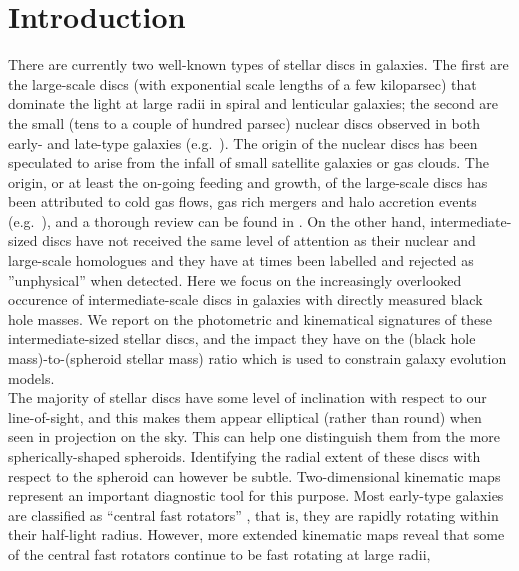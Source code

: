 \documentclass[useAMS,usenatbib,article]{mnras}
\begin{document}
\section{Introduction}
\label{sec:int}
There are currently two well-known types of stellar discs in galaxies. 
The first are the large-scale discs (with exponential scale lengths of a few kiloparsec) 
that dominate the light at large radii in spiral and lenticular galaxies; 
the second are the small (tens to a couple of hundred parsec) nuclear discs observed in both early- and late-type galaxies 
(e.g.~\citealt{scorzavandenbosch1998,rest2001,balcells2007,ledo2010}). 
The origin of the nuclear discs has been speculated to arise from the infall of small satellite galaxies or gas clouds.  
The origin, or at least the on-going feeding and growth, of the large-scale discs has been attributed to cold gas flows, 
gas rich mergers and halo accretion events 
(e.g.~\citealt{whiterees1978,whitefrenk1991,navarrobenz1991,barneshernquist1992,khochfarsilk2006,dekel2009nat,ceverino2010,
ceverino2012,conselice2012,rubin2012,martini2013,ueda2014}), 
and a thorough review can be found in \citet{combes2014arX,combes2014pro}.
On the other hand, intermediate-sized discs have not received the same level of attention 
as their nuclear and large-scale homologues and 
they have at times been labelled and rejected as ''unphysical'' when detected. 
Here we focus on the increasingly overlooked occurence of intermediate-scale discs in galaxies with directly measured black hole masses. 
We report on the photometric and kinematical signatures of these intermediate-sized stellar discs,  
and the impact they have on the (black hole mass)-to-(spheroid stellar mass) ratio 
which is used to constrain galaxy evolution models. \\
The majority of stellar discs have some level of inclination with respect to our line-of-sight, 
and this makes them appear elliptical (rather than round) when seen in projection on the sky. 
This can help one distinguish them from the more spherically-shaped spheroids. 
Identifying the radial extent of these discs with respect to the spheroid can however be subtle. 
Two-dimensional kinematic maps represent an important diagnostic tool for this purpose. 
Most early-type galaxies are classified as ``central fast rotators'' \citep{franx1989,atlas3dIII,scott2014}, 
that is, they are rapidly rotating within their half-light radius.  
However, more extended kinematic maps \citep{arnold2014} reveal that 
some of the central fast rotators continue to be fast rotating at large radii, 
\end{document}
